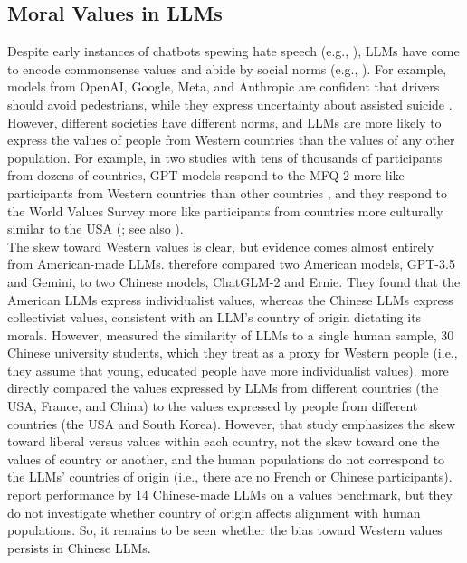 \documentclass[11pt,a4paper]{article}
\begin{document}
\subsection{Moral Values in LLMs}
Despite early instances of chatbots spewing hate speech (e.g., \citealp{wolf2017we}), LLMs have come to encode commonsense values and abide by social norms (e.g., \citealp{schramowski2022large}). For example, models from OpenAI, Google, Meta, and Anthropic are confident that drivers should avoid pedestrians, while they express uncertainty about assisted suicide \cite{scherrer2023evaluating}. However, different societies have different norms, and LLMs are more likely to express the values of people from Western countries than the values of any other population. For example, in two studies with tens of thousands of participants from dozens of countries, GPT models respond to the MFQ-2 more like participants from Western countries than other countries \cite{zewail2025}, and they respond to the World Values Survey more like participants from countries more culturally similar to the USA (\citealp{atari2023humans}; see also \citealp{qi2025whose}).\\
\indent The skew toward Western values is clear, but evidence comes almost entirely from American-made LLMs. \citealp{liu2024evaluating} therefore compared two American models, GPT-3.5 and Gemini, to two Chinese models, ChatGLM-2 and Ernie. They found that the American LLMs express individualist values, whereas the Chinese LLMs express collectivist values, consistent with an LLM’s country of origin dictating its morals. However, \citealp{liu2024evaluating} measured the similarity of LLMs to a single human sample, 30 Chinese university students, which they treat as a proxy for Western people (i.e., they assume that young, educated people have more individualist values). \citealp{munker2025political} more directly compared the values expressed by LLMs from different countries (the USA, France, and China) to the values expressed by people from different countries (the USA and South Korea). However, that study emphasizes the skew toward liberal versus values within each country, not the skew toward one the values of country or another, and the human populations do not correspond to the LLMs’ countries of origin (i.e., there are no French or Chinese participants). \citealp{huang2024flames} report performance by 14 Chinese-made LLMs on a values benchmark, but they do not investigate whether country of origin affects alignment with human populations. So, it remains to be seen whether the bias toward Western values persists in Chinese LLMs.
\end{document}
